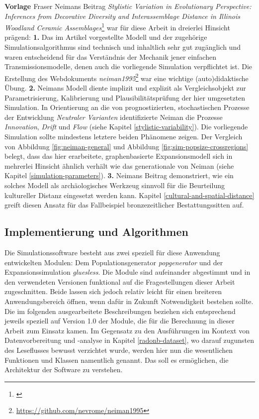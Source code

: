 \documentclass[openany,twoside,twocolumn]{book}
\let\rmarkdownfootnote\footnote%
\def\footnote{\protect\rmarkdownfootnote}
\begin{document}
\textbf{Vorlage \textcite{neiman_stylistic_1995}} \newline 
Fraser Neimans Beitrag \emph{Stylistic Variation in Evolutionary Perspective: Inferences from Decorative Diversity and Interassemblage Distance in Illinois Woodland Ceramic Assemblages}\footnote{\textcite{neiman_stylistic_1995}} war für diese Arbeit in dreierlei Hinsicht prägend: \textbf{1.} Das im Artikel vorgestellte Modell und der zugehörige Simulationsalgorithmus sind technisch und inhaltlich sehr gut zugänglich und waren entscheidend für das Verständnis der Mechanik jener einfachen Transmissionsmodelle, denen auch die vorliegende Simulation verpflichtet ist. Die Erstellung des Webdokuments \emph{neiman1995}\footnote{\url{https://github.com/nevrome/neiman1995}} war eine wichtige (auto)didaktische Übung. \textbf{2.} Neimans Modell diente implizit und explizit als Vergleichsobjekt zur Parametrisierung, Kalibrierung und Plausibilitätsprüfung der hier umgesetzten Simulation. In Orientierung an die von \textcite{dunnell1978style} prognostizierten, stochastischen Prozesse der Entwicklung \emph{Neutraler Varianten} identifizierte Neiman die Prozesse \emph{Innovation}, \emph{Drift} und \emph{Flow} (siehe Kapitel \ref{stylistic-variability}). Die vorliegende Simulation sollte mindestens letztere beiden Phänomene zeigen. Der Vergleich von Abbildung \ref{fig:neiman-general} und Abbildung \ref{fig:sim-popsize-crossregions} belegt, dass das hier erarbeitete, graphenbasierte Expansionsmodell sich in mehrerlei Hinsicht ähnlich verhält wie das generationale von Neiman (siehe Kapitel \ref{simulation-parameters}). \textbf{3.} Neimans Beitrag demonstriert, wie ein solches Modell als archäologisches Werkzeug sinnvoll für die Beurteilung kultureller Distanz eingesetzt werden kann. Kapitel \ref{cultural-and-spatial-distance} greift diesen Ansatz für das Fallbeispiel bronzezeitlicher Bestattungssitten auf.

\hypertarget{implementierung-und-algorithmen}{%
\subsection{Implementierung und Algorithmen}\label{implementierung-und-algorithmen}}

Die Simulationssoftware besteht aus zwei speziell für diese Anwendung entwickelten Modulen: Dem Populationsgenerator \emph{popgenerator} und der Expansionssimulation \emph{gluesless}. Die Module sind aufeinander abgestimmt und in den verwendeten Versionen funktional auf die Fragestellungen dieser Arbeit zugeschnitten. Beide lassen sich jedoch relativ leicht für einen breiteren Anwendungsbereich öffnen, wenn dafür in Zukunft Notwendigkeit bestehen sollte. Die im folgenden ausgearbeitete Beschreibungen beziehen sich entsprechend jeweils speziell auf Version 1.0 der Module, die für die Berechnung in dieser Arbeit zum Einsatz kamen. Im Gegensatz zu den Ausführungen im Kontext von Datenvorbereitung und -analyse in Kapitel \ref{radonb-dataset}, wo darauf zugunsten des Leseflusses bewusst verzichtet wurde, werden hier nun die wesentlichen Funktionen und Klassen namentlich genannt. Das soll es ermöglichen, die Architektur der Software zu verstehen.
\end{document}
